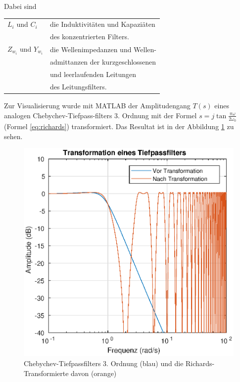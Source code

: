 Dabei sind

\begin{tabular}{ll}
    $L_i$ und $C_i$         & die Induktivit\"aten und Kapazi\"aten \\
                            & des konzentrierten Filters. \\
    $Z_{w_i}$ und $Y_{w_i}$ & die Wellenimpedanzen und Wellen-\\
                            & admittanzen der kurzgeschlossenen \\
                            & und leerlaufenden Leitungen \\
                            & des Leitungsfilters. \\
\end{tabular}

Zur Visualisierung wurde mit MATLAB der  Amplitudengang  $T(s)$ eines analogen
Chebychev-Tiefpass-filters 3.  Ordnung  mit  der  Formel  $s  =  j\tan\frac{\pi
\omega}{2\omega_0}$ (Formel \ref{eq:richards}) transformiert. Das Resultat ist
in der Abbildung \ref{fig:richards-example} zu sehen.

\begin{figure}[h!]
    \centering
    \includegraphics[width=\imagewidth]{images/richards-lowpass-example}
    \caption{Chebychev-Tiefpassfilters 3. Ordnung (blau) und die Richards-Transformierte davon (orange)}
    \label{fig:richards-example}
\end{figure}

